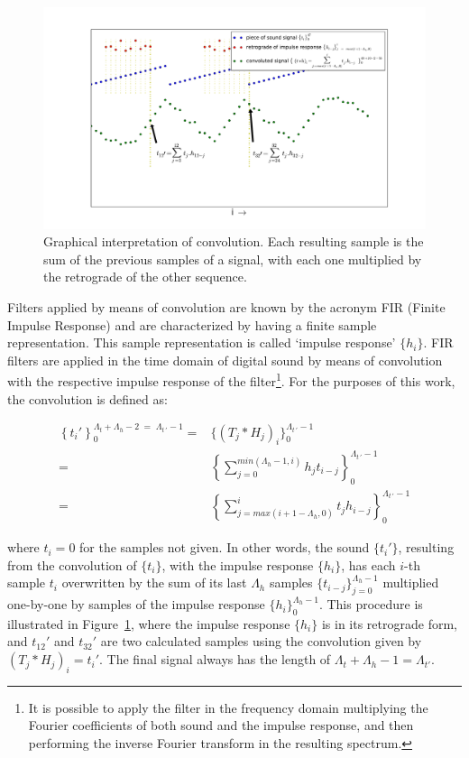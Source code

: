 \documentclass[
 aip,
 jmp,
 amsmath,amssymb,
 reprint,
]{revtex4-1}
\begin{document}
\begin{figure}[h!]
     \centering
         \includegraphics[width=\columnwidth]{figures/convolucao}
     \caption{Graphical interpretation of convolution. Each resulting sample is the sum of the previous samples of a signal, with each one multiplied by the retrograde of the other sequence.}
         \label{fig:conv}
\end{figure}

Filters applied by means of convolution are known by the acronym FIR (Finite Impulse Response) and are characterized by having a finite sample representation. This sample representation is called `impulse response' $\{h_i\}$. FIR filters are applied in the time domain of digital sound by means of convolution with the respective impulse response of the filter\footnote{It is possible to apply the filter in the frequency domain multiplying the Fourier coefficients of both sound and the impulse response, and then performing the inverse Fourier transform in the resulting spectrum.\cite{Openheim}}. For the purposes of this work, the convolution is defined as:

\begin{equation}\label{eq:conv}
 \begin{split}
 \left\{t_i'\right\}_0^{\Lambda_t+\Lambda_h-2\; = \;\Lambda_{t\, '}-1} = & \{(T_j*H_j)_i\}_0^{\Lambda_{t \, '}-1} \\ = & \left \{ \sum_{j=0}^{min(\Lambda_h-1,i)}h_{j} t_{i-j} \right \}_0^{\Lambda_{t\, '}-1} 
     \\ = & \left \{ \sum_{j=max(i+1-\Lambda_h,0)}^{i}t_j h_{i-j} \right \}_0^{\Lambda_{t\, '}-1}
 \end{split}
\end{equation}

\noindent where $t_i=0$ for the samples not given.
In other words, the sound $\{t_i'\}$, resulting from the convolution of $\{t_i\}$, with the impulse response $\{h_i\}$, has each $i$-th sample $t_i$ overwritten by the sum of its last $\Lambda_h$ samples $\{t_{i-j}\}_{j=0}^{\Lambda_h-1}$ multiplied one-by-one by samples of the impulse response $\{h_i\}_0^{\Lambda_h-1}$. This procedure is illustrated in Figure~\ref{fig:conv}, where the impulse response $\{h_i\}$ is in its retrograde form, and $t_{12}'$ and $t_{32}'$ are two calculated samples using the convolution given by $(T_j*H_j)_i=t_i'$. The final signal always has the length of $\Lambda_t+\Lambda_h -1=\Lambda_{t'}$.
\end{document}
